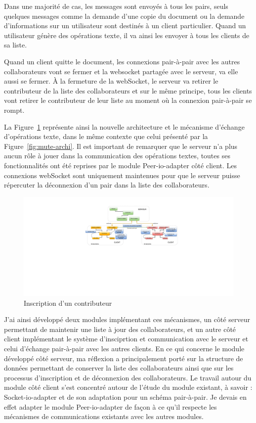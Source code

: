 \documentclass{tnreport}
\begin{document}
Dans une majorité de cas, les messages sont envoyés à tous les pairs, seuls quelques messages comme la demande d'une copie du document ou la demande d'informations sur un utilisateur sont destinés à un client particulier. Quand un utilisateur génère des opérations texte, il va ainsi les envoyer à tous les clients de sa liste.

Quand un client quitte le document, les connexions pair-à-pair avec les autres collaborateurs vont se fermer et la websocket partagée avec le serveur, va elle aussi se fermer. À la fermeture de la webSocket, le serveur va retirer le contributeur de la liste des collaborateurs et sur le même principe, tous les clients vont retirer le contributeur de leur liste au moment où la connexion pair-à-pair se rompt. 

La Figure~\ref{fig:mute-archi-p2p} représente ainsi la nouvelle architecture et le mécanisme d'échange d'opérations texte, dans le même contexte que celui présenté par la Figure~\ref{fig:mute-archi}. Il est important de remarquer que le serveur n'a plus aucun rôle à jouer dans la communication des opérations textes, toutes ses fonctionnalités ont été reprises par le module Peer-io-adapter côté client. Les connexions webSocket sont uniquement maintenues pour que le serveur puisse répercuter la déconnexion d'un pair dans la liste des collaborateurs.

\begin{figure}[!h]
  \centering
  \includegraphics[width=17cm]{figures/MUTE-archi-p2p}
  \caption{Inscription d'un contributeur}
  \label{fig:mute-archi-p2p}
\end{figure}

J'ai ainsi développé deux modules implémentant ces mécanismes, un côté serveur permettant de maintenir une liste à jour des collaborateurs, et un autre côté client implémentant le système d'insciprtion et communication avec le serveur et celui d'échange pair-à-pair avec les autres clients. En ce qui concerne le module développé côté serveur, ma réflexion a principalement porté sur la structure de données permettant de conserver la liste des collaborateurs ainsi que sur les processus d'inscription et de déconnexion des collaborateurs. Le travail autour du module côté client s'est concentré autour de l'étude du module existant, à savoir : Socket-io-adapter et de son adaptation pour un schéma pair-à-pair. Je devais en effet adapter le module Peer-io-adapter de façon à ce qu'il respecte les mécanismes de communications existants avec les autres modules.
\end{document}
